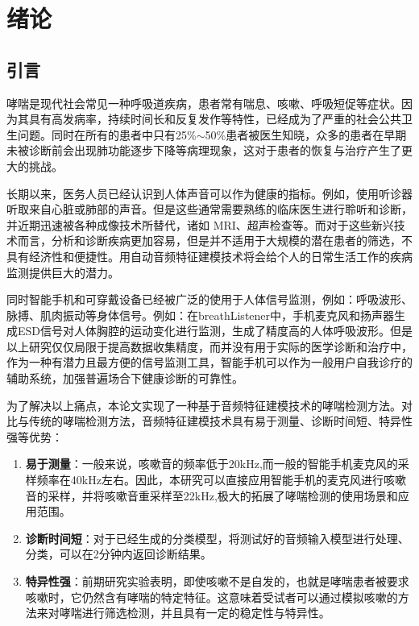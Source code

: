 
\chapter{绪论}

\section{引言}
哮喘是现代社会常见一种呼吸道疾病，患者常有喘息、咳嗽、呼吸短促等症状。因为其具有高发病率，持续时间长和反复发作等特性\cite{louis2000relationship}，已经成为了严重的社会公共卫生问题。同时在所有的患者中只有25\%$ \sim $50\%患者被医生知晓，众多的患者在早期未被诊断前会出现肺功能逐步下降等病理现象，这对于患者的恢复与治疗产生了更大的挑战。\cite{van2003detection}

长期以来，医务人员已经认识到人体声音可以作为健康的指标。例如，使用听诊器听取来自心脏或肺部的声音\cite{pramono2017automatic}。但是这些通常需要熟练的临床医生进行聆听和诊断，并近期迅速被各种成像技术所替代，诸如 MRI、超声检查等。而对于这些新兴技术而言，分析和诊断疾病更加容易，但是并不适用于大规模的潜在患者的筛选，不具有经济性和便捷性。用自动音频特征建模技术将会给个人的日常生活工作的疾病监测提供巨大的潜力。

同时智能手机和可穿戴设备已经被广泛的使用于人体信号监测，例如：呼吸波形\cite{xu2019breathlistener}、脉搏\cite{BloodGlucoseMonitoringSystem}、肌肉振动\cite{barry1992muscle}等身体信号。例如：在breathListener\cite{xu2019breathlistener}中，手机麦克风和扬声器生成ESD信号对人体胸腔的运动变化进行监测，生成了精度高的人体呼吸波形。但是以上研究仅仅局限于提高数据收集精度，而并没有用于实际的医学诊断和治疗中，作为一种有潜力且最方便的信号监测工具，智能手机可以作为一般用户自我诊疗的辅助系统，加强普遍场合下健康诊断的可靠性。

为了解决以上痛点，本论文实现了一种基于音频特征建模技术的哮喘检测方法。对比与传统的哮喘检测方法，音频特征建模技术具有易于测量、诊断时间短、特异性强等优势：
\begin{enumerate}
  \item \textbf{易于测量}：一般来说，咳嗽音的频率低于20kHz,而一般的智能手机麦克风的采样频率在40kHz左右。因此，本研究可以直接应用智能手机的麦克风进行咳嗽音的采样，并将咳嗽音重采样至22kHz,极大的拓展了哮喘检测的使用场景和应用范围。
  \item \textbf{诊断时间短}：对于已经生成的分类模型，将测试好的音频输入模型进行处理、分类，可以在2分钟内返回诊断结果。
  \item \textbf{特异性强}：前期研究实验表明，即使咳嗽不是自发的，也就是哮喘患者被要求咳嗽时，它仍然含有哮喘的特定特征\cite{bales2020can}。这意味着受试者可以通过模拟咳嗽的方法来对哮喘进行筛选检测，并且具有一定的稳定性与特异性。
\end{enumerate}

